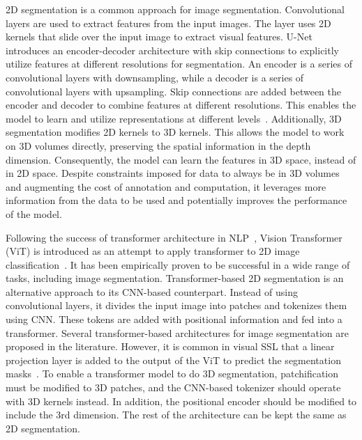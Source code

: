 \documentclass[a4paper,11pt,oneside]{report}
\begin{document}
2D segmentation is a common approach for image segmentation. Convolutional layers are used to extract features from the input images. The layer uses 2D kernels that slide over the input image to extract visual features. U-Net introduces an encoder-decoder architecture with skip connections to explicitly utilize features at different resolutions for segmentation. An encoder is a series of convolutional layers with downsampling, while a decoder is a series of convolutional layers with upsampling. Skip connections are added between the encoder and decoder to combine features at different resolutions. This enables the model to learn and utilize representations at different levels~\cite{Ronneberger2015}. Additionally, 3D segmentation modifies 2D kernels to 3D kernels. This allows the model to work on 3D volumes directly, preserving the spatial information in the depth dimension. Consequently, the model can learn the features in 3D space, instead of in 2D space. Despite constraints imposed for data to always be in 3D volumes and augmenting the cost of annotation and computation, it leverages more information from the data to be used and potentially improves the performance of the model.


Following the success of transformer architecture in NLP~\cite{Vaswani2017}, Vision Transformer (ViT) is introduced as an attempt to apply transformer to 2D image classification~\cite{Dosovitskiy2020vit}. It has been empirically proven to be successful in a wide range of tasks, including image segmentation. Transformer-based 2D segmentation is an alternative approach to its CNN-based counterpart. Instead of using convolutional layers, it divides the input image into patches and tokenizes them using CNN. These tokens are added with positional information and fed into a transformer. Several transformer-based architectures for image segmentation are proposed in the literature. However, it is common in visual SSL that a linear projection layer is added to the output of the ViT to predict the segmentation masks~\cite{Oquab2024dinov, Ranzinger2024RADIO}. To enable a transformer model to do 3D segmentation, patchification must be modified to 3D patches, and the CNN-based tokenizer should operate with 3D kernels instead. In addition, the positional encoder should be modified to include the 3rd dimension. The rest of the architecture can be kept the same as 2D segmentation.

\end{document}
